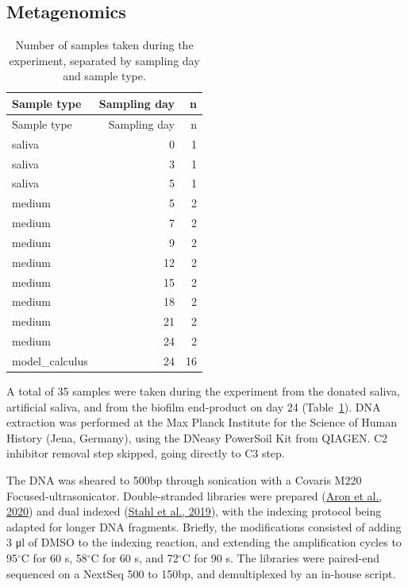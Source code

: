 \documentclass[
  b5paper,
]{book}
\begin{document}
\hypertarget{metagenomics}{%
\subsection{Metagenomics}\label{metagenomics}}

\hypertarget{tbl-dna-samples}{}
\begin{longtable}[]{@{}lrr@{}}
\caption{\label{tbl-dna-samples}Number of samples taken during the
experiment, separated by sampling day and sample type.}\tabularnewline
\toprule\noalign{}
Sample type & Sampling day & n \\
\midrule\noalign{}
\endfirsthead
\toprule\noalign{}
Sample type & Sampling day & n \\
\midrule\noalign{}
\endhead
\bottomrule\noalign{}
\endlastfoot
saliva & 0 & 1 \\
saliva & 3 & 1 \\
saliva & 5 & 1 \\
medium & 5 & 2 \\
medium & 7 & 2 \\
medium & 9 & 2 \\
medium & 12 & 2 \\
medium & 15 & 2 \\
medium & 18 & 2 \\
medium & 21 & 2 \\
medium & 24 & 2 \\
model\_calculus & 24 & 16 \\
\end{longtable}

A total of 35 samples were taken during the experiment from the donated
saliva, artificial saliva, and from the biofilm end-product on day 24
(Table~\ref{tbl-dna-samples}). DNA extraction was performed at the Max
Planck Institute for the Science of Human History (Jena, Germany), using
the DNeasy PowerSoil Kit from QIAGEN. C2 inhibitor removal step skipped,
going directly to C3 step.

The DNA was sheared to 500bp through sonication with a Covaris M220
Focused-ultrasonicator. Double-stranded libraries were prepared
(\protect\hyperlink{ref-aronHalfUDG2020}{Aron et al., 2020}) and dual
indexed (\protect\hyperlink{ref-stahlDoublestrandedIndexing2019}{Stahl
et al., 2019}), with the indexing protocol being adapted for longer DNA
fragments. Briefly, the modifications consisted of adding 3 μl of DMSO
to the indexing reaction, and extending the amplification cycles to
95\(^{\circ}\)C for 60 s, 58\(^{\circ}\)C for 60 s, and 72\(^{\circ}\)C
for 90 s. The libraries were paired-end sequenced on a NextSeq 500 to
150bp, and demultiplexed by an in-house script.
\end{document}

